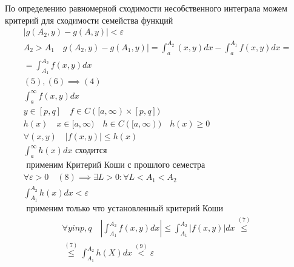 \documentclass[main]{subfiles}
\begin{document}
          \begin{longProof}
               По определению равномерной сходимости несобственного интеграла можем критерий для сходимости семейства функций
               \begin{gather*}
               |g(A_2,y) - g(A,y)| < \varepsilon \tag{5}\\
               A_2 > A_1 \quad g(A_2,y) - g(A_1,y)|  = \int^{A_2}_a(x,y) dx - \int^{A_1}_a f(x,y)dx = \\
               =\int^{A_2}_{A_1} f(x,y) dx \tag{6}\\
               (5),(6) \implies (4)\\
               \int^\infty_a f(x,y) dx \\
               y \in [p,q] \quad f \in C([a,\infty) \times [p,q]) \\
               h(x) \quad x \in [a, \infty) \quad h \in C([a,\infty)) \quad h(x) \geq 0 \\
               \forall (x,y) \quad |f(x,y)| \leq h(x) \tag{7}\\
               \int^\infty_a h(x) dx \text{ сходится } \tag{8}\\
               \text{ применим Критерий Коши с прошлого семестра}\\
               \forall \varepsilon > 0 \quad (8) \implies \exists L > 0 : \forall L < A_1 < A_2 \\
               \int^{A_2}_{A_1} h(x) dx < \varepsilon \tag{9} \\
               \text{ применим только что установленный критерий Коши} \end{gather*}
               \begin{multline*}
               \forall y in p,q \quad \left | \int^{A_2}_{A_1} f(x,y) dx \right | \leq \int_{A_1}^{A_2} |f(x,y)| dx \stackrel{(7)}{\leq}  \\
               \stackrel{(7)}{\leq} \int^{A_2}_{A_1} h(X) dx \stackrel{(9)}{<} \varepsilon \tag{10}
          \end{multline*}
     \end{longProof}
\end{document}
